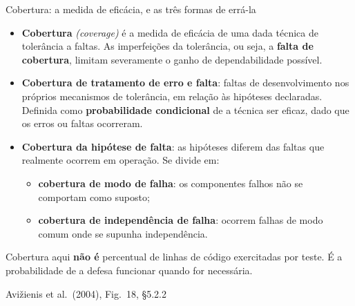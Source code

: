 \documentclass{beamer}
\newcommand{\en}[1]{{\color{depCinza}\textit{#1}}}
\newcommand{\sect}[1]{\par\smallskip\hfill{\tiny\color{black!55}Avi\v{z}ienis et al.\ (2004), #1}}
\begin{document}
\begin{frame}{Cobertura: a medida de efic\'acia, e as tr\^es formas de err\'a-la}
    \centering
    \diagCobertura
    \vspace{0.2em}
    \scriptsize
    \begin{itemize}
        \item \textbf{Cobertura} \en{(coverage)} \'e a medida de efic\'acia de uma dada t\'ecnica de toler\^ancia a faltas. As imperfei\c{c}\~oes da toler\^ancia, ou seja, a \textbf{falta de cobertura}, limitam severamente o ganho de dependabilidade poss\'ivel.
        \item \textbf{Cobertura de tratamento de erro e falta}: faltas de desenvolvimento nos pr\'oprios mecanismos de toler\^ancia, em rela\c{c}\~ao \`as hip\'oteses declaradas. Definida como \textbf{probabilidade condicional} de a t\'ecnica ser eficaz, dado que os erros ou faltas ocorreram.
        \item \textbf{Cobertura da hip\'otese de falta}: as hip\'oteses diferem das faltas que realmente ocorrem em opera\c{c}\~ao. Se divide em:
        \begin{itemize}
            \item \textbf{cobertura de modo de falha}: os componentes falhos n\~ao se comportam como suposto;
            \item \textbf{cobertura de independ\^encia de falha}: ocorrem falhas de modo comum onde se supunha independ\^encia.
        \end{itemize}
    \end{itemize}
    \smallskip
    \begin{armadilha}
        \scriptsize
        Cobertura aqui \textbf{n\~ao \'e} percentual de linhas de c\'odigo exercitadas por teste. \'E a probabilidade de a defesa funcionar quando for necess\'aria.
    \end{armadilha}
    \sect{Fig.\ 18, \S5.2.2}
\end{frame}
\end{document}
